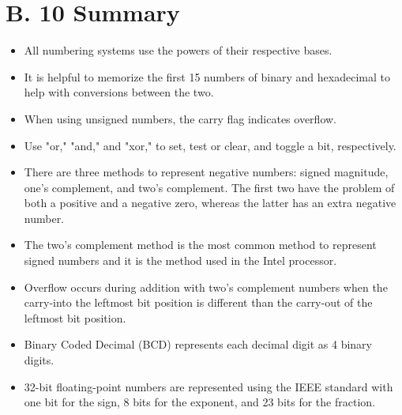\documentclass[10pt]{article}
\begin{document}
\section*{B. 10 Summary}
\begin{itemize}
  \item All numbering systems use the powers of their respective bases.
  \item It is helpful to memorize the first 15 numbers of binary and hexadecimal to help with conversions between the two.
  \item When using unsigned numbers, the carry flag indicates overflow.
  \item Use "or," "and," and "xor," to set, test or clear, and toggle a bit, respectively.
  \item There are three methods to represent negative numbers: signed magnitude, one's complement, and two's complement. The first two have the problem of both a positive and a negative zero, whereas the latter has an extra negative number.
  \item The two's complement method is the most common method to represent signed numbers and it is the method used in the Intel processor.
  \item Overflow occurs during addition with two's complement numbers when the carry-into the leftmost bit position is different than the carry-out of the leftmost bit position.
  \item Binary Coded Decimal (BCD) represents each decimal digit as 4 binary digits.
  \item 32-bit floating-point numbers are represented using the IEEE standard with one bit for the sign, 8 bits for the exponent, and 23 bits for the fraction.
\end{itemize}
\end{document}
